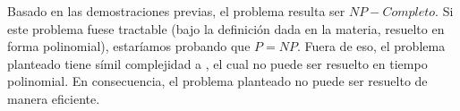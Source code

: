 \documentclass[../tp3_grupo404.tex]{subfiles}
\begin{document}
Basado en las demostraciones previas, el problema resulta ser $NP-Completo$.
Si este problema fuese tractable (bajo la definición dada en la materia, resuelto en forma polinomial),
estaríamos probando que $P=NP$.
Fuera de eso, el problema planteado tiene símil complejidad a ,
el cual no puede ser resuelto en tiempo polinomial. En consecuencia, el problema planteado
no puede ser resuelto de manera eficiente.

\end{document}

